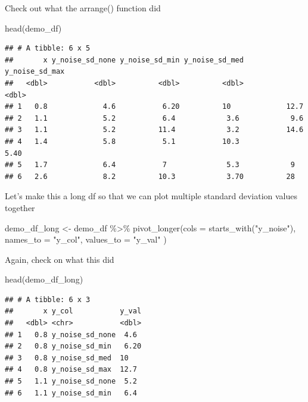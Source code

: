 \documentclass[
]{book}
\newenvironment{Shaded}{\begin{snugshade}}{\end{snugshade}}
\newcommand{\AttributeTok}[1]{\textcolor[rgb]{0.77,0.63,0.00}{#1}}
\newcommand{\FunctionTok}[1]{\textcolor[rgb]{0.00,0.00,0.00}{#1}}
\newcommand{\NormalTok}[1]{#1}
\newcommand{\OtherTok}[1]{\textcolor[rgb]{0.56,0.35,0.01}{#1}}
\newcommand{\SpecialCharTok}[1]{\textcolor[rgb]{0.00,0.00,0.00}{#1}}
\newcommand{\StringTok}[1]{\textcolor[rgb]{0.31,0.60,0.02}{#1}}
\begin{document}
Check out what the arrange() function did

\begin{Shaded}
\begin{Highlighting}[]
\FunctionTok{head}\NormalTok{(demo\_df)}
\end{Highlighting}
\end{Shaded}

\begin{verbatim}
## # A tibble: 6 x 5
##       x y_noise_sd_none y_noise_sd_min y_noise_sd_med y_noise_sd_max
##   <dbl>           <dbl>          <dbl>          <dbl>          <dbl>
## 1   0.8             4.6           6.20          10             12.7 
## 2   1.1             5.2           6.4            3.6            9.6 
## 3   1.1             5.2          11.4            3.2           14.6 
## 4   1.4             5.8           5.1           10.3            5.40
## 5   1.7             6.4           7              5.3            9   
## 6   2.6             8.2          10.3            3.70          28
\end{verbatim}

Let's make this a long df so that we can plot multiple standard deviation values together

\begin{Shaded}
\begin{Highlighting}[]
\NormalTok{demo\_df\_long }\OtherTok{\textless{}{-}}\NormalTok{ demo\_df }\SpecialCharTok{\%\textgreater{}\%} 
  \FunctionTok{pivot\_longer}\NormalTok{(}\AttributeTok{cols =} \FunctionTok{starts\_with}\NormalTok{(}\StringTok{"y\_noise"}\NormalTok{),}
               \AttributeTok{names\_to =} \StringTok{"y\_col"}\NormalTok{,}
               \AttributeTok{values\_to =} \StringTok{"y\_val"}
\NormalTok{  )}
\end{Highlighting}
\end{Shaded}

Again, check on what this did

\begin{Shaded}
\begin{Highlighting}[]
\FunctionTok{head}\NormalTok{(demo\_df\_long)}
\end{Highlighting}
\end{Shaded}

\begin{verbatim}
## # A tibble: 6 x 3
##       x y_col           y_val
##   <dbl> <chr>           <dbl>
## 1   0.8 y_noise_sd_none  4.6 
## 2   0.8 y_noise_sd_min   6.20
## 3   0.8 y_noise_sd_med  10   
## 4   0.8 y_noise_sd_max  12.7 
## 5   1.1 y_noise_sd_none  5.2 
## 6   1.1 y_noise_sd_min   6.4
\end{verbatim}
\end{document}
